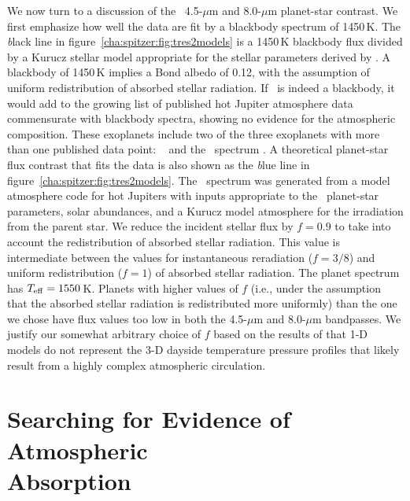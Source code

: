 We now turn to a discussion of the \tresTwo\ 4.5-$\mu$m and 8.0-$\mu$m planet-star contrast.
We first emphasize how well the data are fit by a blackbody spectrum of 1450\,K.
The {\textit black line} in figure~\ref{cha:spitzer:fig:tres2models} is a 1450\,K blackbody flux divided by a Kurucz stellar model appropriate for the stellar parameters derived by \citet{Sozzetti_Torres_Charbonneau:apj:2007a}.
A blackbody of 1450\,K implies a Bond albedo of 0.12, with the assumption of uniform redistribution of absorbed stellar radiation.
If \tresTwo\ is indeed a blackbody, it would add to the growing list of published hot Jupiter atmosphere data commensurate with blackbody spectra, showing no evidence for the atmospheric composition.
These exoplanets include two of the three exoplanets with more than one published data point: \tresOne\ \citep{Charbonneau_Allen_Megeath:apj:2005a} and the \hdOENb\ spectrum \citep{Grillmair_Charbonneau_Burrows:apjl:2007a}.
A theoretical planet-star flux contrast that fits the data is also shown as the {\textit blue line} in figure~\ref{cha:spitzer:fig:tres2models}.
The \tresTwo\ spectrum was generated from a model atmosphere code for hot Jupiters \citep{Seager_Richardson_Hansen:apj:2005a} with inputs appropriate to the \tresTwo\ planet-star parameters, solar abundances, and a Kurucz model atmosphere for the irradiation from the parent star.
We reduce the incident stellar flux by \mbox{$f=0.9$} to take into account the redistribution of absorbed stellar radiation.
This value is intermediate between the values for instantaneous reradiation (\mbox{$f=3/8$}) and uniform redistribution (\mbox{$f=1$}) of absorbed stellar radiation.
The planet spectrum has \mbox{$T_{\rm eff}=1550$\,K}.
Planets with higher values of $f$ (i.e., under the assumption that the absorbed stellar radiation is redistributed more uniformly) than the one we chose have flux values too low in both the 4.5-$\mu$m and 8.0-$\mu$m bandpasses.
We justify our somewhat arbitrary choice of $f$ based on the results of \citet{Fortney_Cooper_Showman:apj:2006a} that 1-D models do not represent the 3-D dayside temperature pressure profiles that likely result from a highly complex atmospheric circulation.

\section[Searching for Evidence of Atmospheric Absorption]{Searching for Evidence of Atmospheric \\ Absorption}\label{cha:spitzer:sec:discuss}

